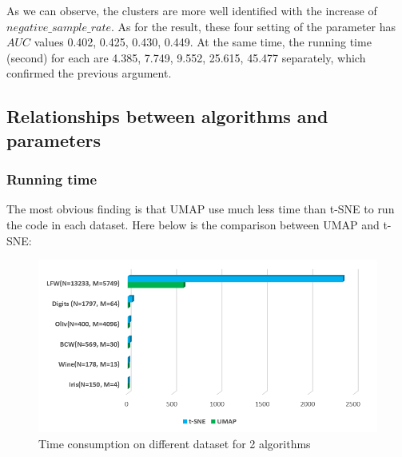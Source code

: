 \noindent As we can observe, the clusters are more well identified with the increase of $negative\_sample\_rate$. As for the result, these four setting of the parameter has $AUC$ values 0.402, 0.425,  0.430, 0.449. At the same time, the running time (second) for each are 4.385, 7.749, 9.552,  25.615,  45.477 separately, which confirmed the previous argument.\\

\subsection{Relationships between algorithms and parameters}

\subsubsection{Running time}

The most obvious finding is that UMAP use much less time than t-SNE to run the code in each dataset. Here below is the comparison between UMAP and t-SNE: 

\begin{figure}[ht]

\centering
\includegraphics[width=12cm,height=7cm\textwidth]{images/image_time_umap_t-SNE.PNG}
\caption{Time consumption on different dataset for 2 algorithms
}
\label{fig:label}
\end{figure}\\

